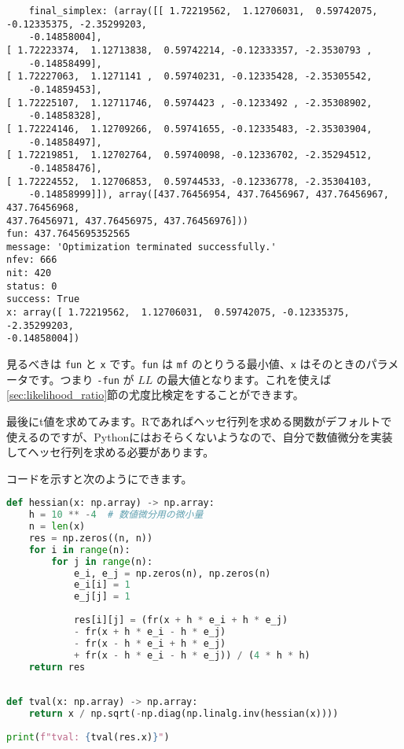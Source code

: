     \begin{lstlisting}
    final_simplex: (array([[ 1.72219562,  1.12706031,  0.59742075, -0.12335375, -2.35299203,
    -0.14858004],
[ 1.72223374,  1.12713838,  0.59742214, -0.12333357, -2.3530793 ,
    -0.14858499],
[ 1.72227063,  1.1271141 ,  0.59740231, -0.12335428, -2.35305542,
    -0.14859453],
[ 1.72225107,  1.12711746,  0.5974423 , -0.1233492 , -2.35308902,
    -0.14858328],
[ 1.72224146,  1.12709266,  0.59741655, -0.12335483, -2.35303904,
    -0.14858497],
[ 1.72219851,  1.12702764,  0.59740098, -0.12336702, -2.35294512,
    -0.14858476],
[ 1.72224552,  1.12706853,  0.59744533, -0.12336778, -2.35304103,
    -0.14858999]]), array([437.76456954, 437.76456967, 437.76456967, 437.76456968,
437.76456971, 437.76456975, 437.76456976]))
fun: 437.7645695352565
message: 'Optimization terminated successfully.'
nfev: 666
nit: 420
status: 0
success: True
x: array([ 1.72219562,  1.12706031,  0.59742075, -0.12335375, -2.35299203,
-0.14858004])
\end{lstlisting}

    見るべきは \lstinline{fun} と \lstinline{x} です。\lstinline{fun} は \lstinline{mf} のとりうる最小値、\lstinline{x} はそのときのパラメータです。つまり \lstinline{-fun} が $LL$ の最大値となります。これを使えば\ref{sec:likelihood_ratio}節の尤度比検定をすることができます。

    最後にt値を求めてみます。Rであればヘッセ行列を求める関数がデフォルトで使えるのですが、Pythonにはおそらくないようなので、自分で数値微分を実装してヘッセ行列を求める必要があります。

    コードを示すと次のようにできます。

    \begin{lstlisting}[language=Python]
def hessian(x: np.array) -> np.array:
    h = 10 ** -4  # 数値微分用の微小量
    n = len(x)
    res = np.zeros((n, n))
    for i in range(n):
        for j in range(n):
            e_i, e_j = np.zeros(n), np.zeros(n)
            e_i[i] = 1
            e_j[j] = 1
            
            res[i][j] = (fr(x + h * e_i + h * e_j)
            - fr(x + h * e_i - h * e_j)
            - fr(x - h * e_i + h * e_j)
            + fr(x - h * e_i - h * e_j)) / (4 * h * h)
    return res
    
    
def tval(x: np.array) -> np.array:
    return x / np.sqrt(-np.diag(np.linalg.inv(hessian(x))))
    
print(f"tval: {tval(res.x)}")
\end{lstlisting}

